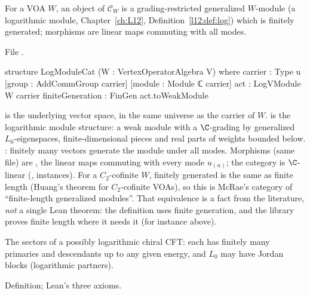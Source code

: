 \begin{definition}\label{l21:def:logcat}
For a VOA $W$, an object of $\mathcal C_W$ is a grading-restricted generalized $W$-module (a logarithmic module,
Chapter~\ref{ch:L12}, Definition~\ref{l12:def:log}) which is finitely generated; morphisms are linear maps commuting with
all modes.
\end{definition}
\noindent File .
\begin{leancode}
structure LogModuleCat (W : VertexOperatorAlgebra V) where
  carrier : Type u
  [group : AddCommGroup carrier]
  [module : Module ℂ carrier]
  act : LogVModule W carrier
  finiteGeneration : FinGen act.toWeakModule
\end{leancode}

\begin{dictionary}
 is the underlying vector space, in the same universe  as the carrier  of $W$.
 is the logarithmic module structure: a weak module with a $\C$-grading by generalized
$L_0$-eigenspaces, finite-dimensional pieces and real parts of weights bounded below. : finitely
many vectors generate the module under all modes. Morphisms (same file) are , the linear maps
commuting with every mode $u_{(n)}$; the category is $\C$-linear (,  instances). For a
$C_2$-cofinite $W$, finitely generated is the same as finite length (Huang's theorem for $C_2$-cofinite VOAs), so this is
McRae's category of ``finite-length generalized modules''. That equivalence is a fact from the literature, \emph{not} a
single Lean theorem: the definition uses finite generation, and the library proves finite length where it needs it
(for instance  above).
\end{dictionary}

\begin{physics}
The sectors of a possibly logarithmic chiral CFT: each has finitely many primaries and descendants up to any given
energy, and $L_0$ may have Jordan blocks (logarithmic partners).
\end{physics}

\begin{status}
Definition; Lean's three axioms.
\end{status}

